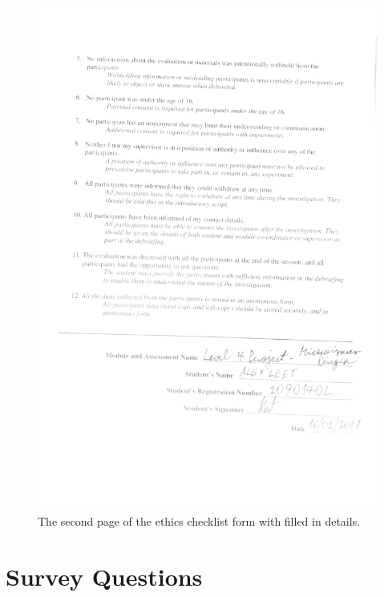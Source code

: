 \documentclass{4thYearProject}
\begin{document}
\begin{appendices}
\begin{figure}
\includegraphics[scale=0.15]{Checklist_2}
\centering
\caption{The second page of the ethics checklist form with filled in details.}
\label{fig:Survey_1}
\end{figure}

\chapter{Survey Questions}


\end{appendices}
\end{document}

